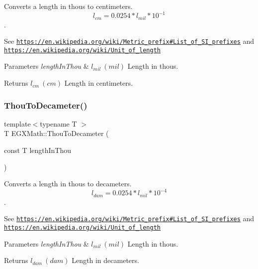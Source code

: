 Converts a length in thous to centimeters. \[ l_{cm}=0.0254 * l_{mil} * 10^{-1} \]. 

See \href{https://en.wikipedia.org/wiki/Metric_prefix#List_of_SI_prefixes}{\tt https\+://en.\+wikipedia.\+org/wiki/\+Metric\+\_\+prefix\#\+List\+\_\+of\+\_\+\+S\+I\+\_\+prefixes} and \href{https://en.wikipedia.org/wiki/Unit_of_length}{\tt https\+://en.\+wikipedia.\+org/wiki/\+Unit\+\_\+of\+\_\+length} 
\begin{DoxyParams}{Parameters}
{\em length\+In\+Thou} & $ l_{mil}\ (mil)$ Length in thous. \\
\hline
\end{DoxyParams}
\begin{DoxyReturn}{Returns}
$ l_{cm}\ (cm)$ Length in centimeters. 
\end{DoxyReturn}
\mbox{\label{group___e_g_x_math-_conversions-_length_conversions-_imperial-_thou-_s_i_gab03dfc8772a388c93d1504f2b1c5717a}} 
\subsubsection{\texorpdfstring{Thou\+To\+Decameter()}{ThouToDecameter()}}
{\footnotesize\ttfamily template$<$typename T $>$ \\
T E\+G\+X\+Math\+::\+Thou\+To\+Decameter (\begin{DoxyParamCaption}\item[{const T}]{length\+In\+Thou }\end{DoxyParamCaption})}



Converts a length in thous to decameters. \[ l_{dam}=0.0254 * l_{mil} * 10^{-4} \]. 

See \href{https://en.wikipedia.org/wiki/Metric_prefix#List_of_SI_prefixes}{\tt https\+://en.\+wikipedia.\+org/wiki/\+Metric\+\_\+prefix\#\+List\+\_\+of\+\_\+\+S\+I\+\_\+prefixes} and \href{https://en.wikipedia.org/wiki/Unit_of_length}{\tt https\+://en.\+wikipedia.\+org/wiki/\+Unit\+\_\+of\+\_\+length} 
\begin{DoxyParams}{Parameters}
{\em length\+In\+Thou} & $ l_{mil}\ (mil)$ Length in thous. \\
\hline
\end{DoxyParams}
\begin{DoxyReturn}{Returns}
$ l_{dam}\ (dam)$ Length in decameters. 
\end{DoxyReturn}
\mbox{\label{group___e_g_x_math-_conversions-_length_conversions-_imperial-_thou-_s_i_ga9eb7f14e77defb2c5008314b9c92e6dd}} 
